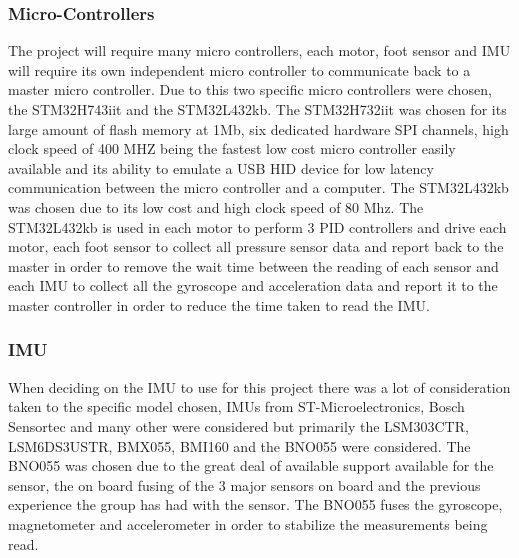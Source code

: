         \subsubsection{Micro-Controllers}
            The project will require many micro controllers, each motor, foot sensor and IMU will require its own independent micro controller to communicate back to a master micro controller. Due to this two specific micro controllers were chosen, the STM32H743iit\cite{STM32H43IIT} and the STM32L432kb\cite{STM32l432KB}. The STM32H732iit was chosen for its large amount of flash memory at 1Mb, six dedicated hardware SPI channels, high clock speed of 400 MHZ being the fastest low cost micro controller easily available and its ability to emulate a USB HID device for low latency communication between the micro controller and a computer. The STM32L432kb was chosen due to its low cost and high clock speed of 80 Mhz. The STM32L432kb is used in each motor to perform 3 PID controllers and drive each motor, each foot sensor to collect all pressure sensor data and report back to the master in order to remove the wait time between the reading of each sensor and each IMU to collect all the gyroscope and acceleration data and report it to the master controller in order to reduce the time taken to read the IMU. 
            
            
        \subsubsection{IMU}
            When deciding on the IMU to use for this project there was a lot of consideration taken to the specific model chosen, IMUs from ST-Microelectronics, Bosch Sensortec and many other were considered but primarily the LSM303CTR, LSM6DS3USTR, BMX055, BMI160 and the BNO055\cite{BNO055} were considered. The BNO055 was chosen due to the great deal of available support available for the sensor, the on board fusing of the 3 major sensors on board and the previous experience the group has had with the sensor. The BNO055 fuses the gyroscope, magnetometer and accelerometer in order to stabilize the measurements being read.  
            
